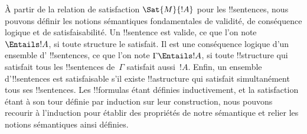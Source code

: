 \documentclass[../../../include/open-logic-section]{subfiles}
\begin{document}
À partir de la relation de satisfaction $\Sat{M}{!A}$ pour
les !!{sentence}s, nous pouvons définir les notions sémantiques
fondamentales de validité, de conséquence logique et de
satisfaisabilité. Un !!{sentence} est valide, ce que l'on note
$\Entails !A$, si toute structure le satisfait.
Il est une conséquence logique d'un ensemble d'%
!!{sentence}s, ce que l'on note $\Gamma\Entails !A$, si toute
!!{structure} qui satisfait tous les !!{sentence}s
de~$\Gamma$ satisfait aussi~$!A$.
Enfin, un ensemble d'!!{sentence}s est satisfaisable s'il existe
!!a{structure} qui satisfait simultanément tous ses
!!{sentence}s. Les !!{formula}s étant définies inductivement,
et la satisfaction étant à son tour définie par induction
sur leur construction, nous pouvons recourir à l'induction
pour établir des propriétés de notre sémantique et relier
les notions sémantiques ainsi définies.
\end{document}
